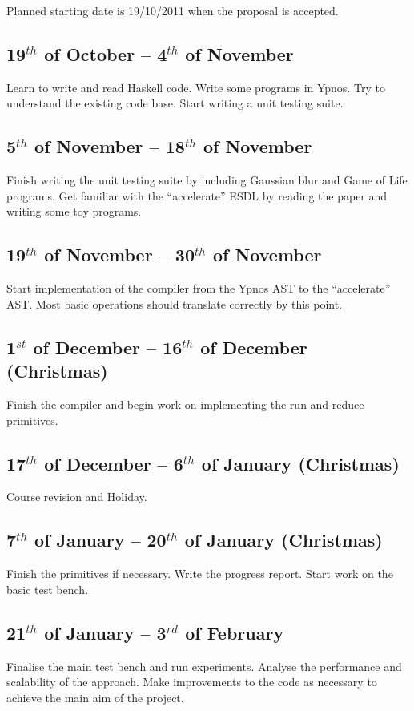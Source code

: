 Planned starting date is 19/10/2011 when the proposal is accepted.

\subsection*{19$^{th}$ of October -- 4$^{th}$ of November} Learn to write and read 
Haskell code.  Write some programs in Ypnos. Try to understand the existing 
code base.  Start writing a unit testing suite.

\subsection*{5$^{th}$ of November -- 18$^{th}$ of November} Finish writing the unit 
testing suite by including Gaussian blur and Game of Life programs. Get 
familiar with the ``accelerate'' ESDL by reading the paper and writing some toy 
programs. 

\subsection*{19$^{th}$ of November -- 30$^{th}$ of November} Start implementation 
of the compiler from the Ypnos AST to the ``accelerate'' AST. Most basic 
operations should translate correctly by this point.

\subsection*{1$^{st}$ of December -- 16$^{th}$ of December (Christmas)} Finish 
the compiler and begin work on implementing the run and reduce primitives.

\subsection*{17$^{th}$ of December -- 6$^{th}$ of January (Christmas)} Course 
revision and Holiday.

\subsection*{7$^{th}$ of January -- 20$^{th}$ of January (Christmas)} Finish the 
primitives if necessary.  Write the progress report.  Start work on the basic 
test bench.

\subsection*{21$^{th}$ of January -- 3$^{rd}$ of February} Finalise the main 
test bench and run experiments.  Analyse the performance and scalability of the 
approach.  Make improvements to the code as necessary to achieve the main aim 
of the project. 


